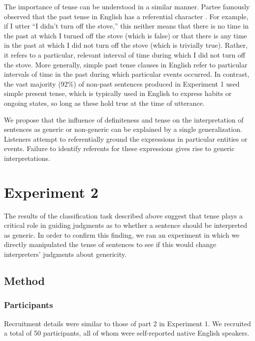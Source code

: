 \documentclass[10pt,letterpaper]{article}
\begin{document}
The importance of tense can be understood in a similar manner. Partee famously observed that the past tense in English has a referential character \cite{Partee:1973}. For example, if I utter ``I didn't turn off the stove,'' this neither means that there is no time in the past at which I turned off the stove (which is false) or that there is any time in the past at which I did not turn off the stove (which is trivially true). Rather, it refers to a particular, relevant interval of time during which I did not turn off the stove. More generally, simple past tense clauses in English refer to particular intervals of time in the past during which particular events occurred. In contrast, the vast majority (92\%) of non-past sentences produced in Experiment 1 used simple present tense, which is typically used in English to express habits or ongoing states, so long as these hold true at the time of utterance.

We propose that the influence of definiteness and tense on the interpretation of sentences as generic or non-generic can be explained by a single generalization. Listeners attempt to referentially ground the expressions in particular entities or events. Failure to identify referents for these expressions gives rise to generic interpretations.

\section{Experiment 2}

The results of the classification task described above suggest that tense plays a critical role in guiding judgments as to whether a sentence should be interpreted as generic. In order to confirm this finding, we ran an experiment in which we directly manipulated the tense of sentences to see if this would change interpreters' judgments about genericity.

\subsection{Method}

\subsubsection{Participants}

Recruitment details were similar to those of part 2 in Experiment 1. We recruited a total of 50 participants, all of whom were self-reported native English speakers.
\end{document}
